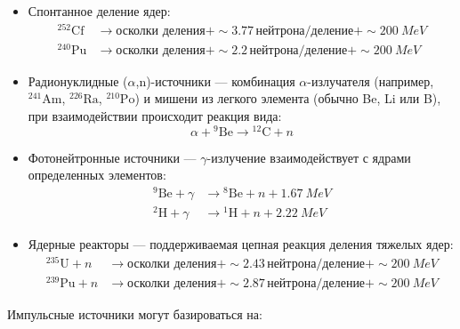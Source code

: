 \documentclass[a4paper]{article}
\begin{document}
\begin{itemize}
    \item Спонтанное деление ядер:
    \begin{align*}
        ^{252}\text{Cf} &\to \text{осколки деления} + \sim3.77\,\text{нейтрона/деление} + \sim\SI{200}{MeV} \\
        ^{240}\text{Pu} &\to \text{осколки деления} + \sim2.2\,\text{нейтрона/деление} + \sim\SI{200}{MeV}
    \end{align*}
    
    \item Радионуклидные ($\alpha$,n)-источники --- комбинация $\alpha$-излучателя (например, \(^{241}\text{Am}\), \(^{226}\text{Ra}\), \(^{210}\text{Po}\)) и мишени из легкого элемента (обычно Be, Li или B), при взаимодействии происходит реакция вида:
    \[
    \alpha + {}^9\text{Be} \to {}^{12}\text{C} + n
    \]
    
    \item Фотонейтронные источники --- $\gamma$-излучение взаимодействует с ядрами определенных элементов:
    \begin{align*}
        ^9\text{Be} + \gamma &\to {}^8\text{Be} + n + \SI{1.67}{MeV} \\
        ^2\text{H} + \gamma &\to {}^1\text{H} + n + \SI{2.22}{MeV}
    \end{align*}
    
    \item Ядерные реакторы --- поддерживаемая цепная реакция деления тяжелых ядер:
    \begin{align*}
        ^{235}\text{U} + n &\to \text{осколки деления} + \sim2.43\,\text{нейтрона/деление} + \sim\SI{200}{MeV} \\
        ^{239}\text{Pu} + n &\to \text{осколки деления} + \sim2.87\,\text{нейтрона/деление} + \sim\SI{200}{MeV}
    \end{align*}
\end{itemize}

Импульсные источники могут базироваться на:
\end{document}
